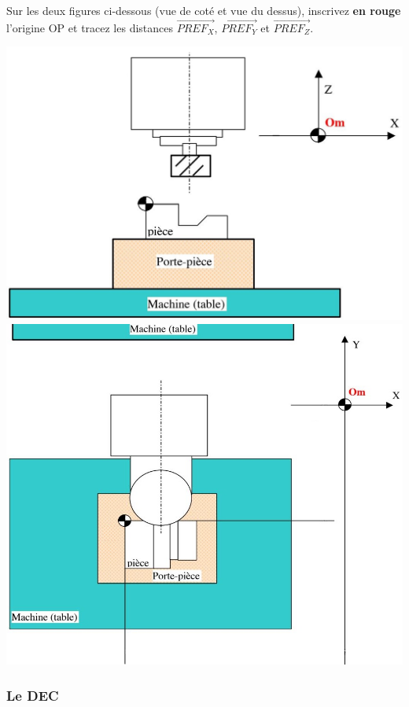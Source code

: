 \documentclass[12pt]{article}
\newcounter{exo}
\newenvironment{exo}{\stepcounter{exo}\vspace{0.5cm}{\bfseries Question \theexo\ :}}{\par\vspace{0.5cm}}
\begin{document}
\begin{exo}\label{exo1} Sur les deux figures ci-dessous (vue de coté et vue du dessus), inscrivez \textbf{en rouge} l'origine OP et tracez les distances $\overrightarrow{PREF_X}$, $\overrightarrow{PREF_Y}$ et $\overrightarrow{PREF_Z}$.\end{exo}
\begin{center}
\includegraphics[width=0.8\linewidth]{OmOP1.JPG}
\includegraphics[width=0.8\linewidth]{OmOP2.JPG}
\end{center}

\subsubsection{Le DEC}
\end{document}
